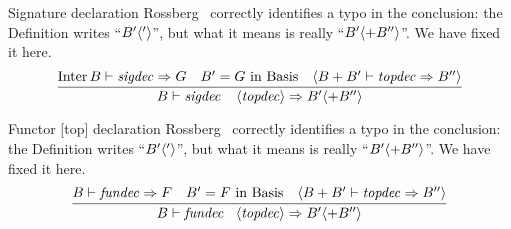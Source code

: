 \begin{inference-rule}{Signature declaration}
Rossberg~\cite{rossberg2018defects} correctly identifies a typo in the
conclusion: the Definition writes ``$B'\langle'\rangle$'', but what it
means is really ``$B'\langle+B''\rangle$''. We have fixed it here.
\begin{equation}\label{rule:dynamic-modules:signature-declaration}
\vcenter{\infer{\B\ts\sigdecintopdec\ra \B'\optional{+\B''}}
  {\Inter\B\ts\sigdec\ra\G
    & B' = \G\ \In\ \Basis
    & \optional{ \B + \B'\ts\topdec\ra\B''}}}
\end{equation}
\end{inference-rule}

\begin{inference-rule}{Functor [top] declaration}
Rossberg~\cite{rossberg2018defects} correctly identifies a typo in the
conclusion: the Definition writes ``$B'\langle'\rangle$'', but what it
means is really ``$B'\langle+B''\rangle$''. We have fixed it here.
\begin{equation}\label{rule:dynamic-modules:functor-top-declaration}
\vcenter{\infer{\B\ts\fundecintopdec\ra\B'\optional{+\B''}}
  {\B\ts\fundec\ra\F
    & \B' = \F\ \In\ \Basis
    & \optional{ \B + \B'\ts\topdec\ra\B''}}}
\end{equation}
\end{inference-rule}